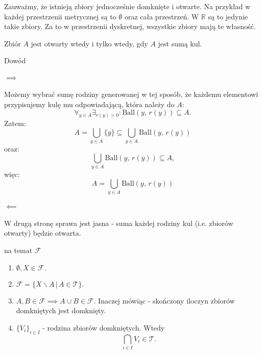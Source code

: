 \documentclass{article}
\numberwithin{defi}{section}
\numberwithin{defi}{section}
\newcommand{\R}{\mathbb{R}}
\newcommand{\Tau}{\mathcal{T}}
\newcommand{\Fau}{\mathcal{F}}
\newcommand{\ball}[2]{\text{Ball}(#1, \, #2)}
\begin{document}
Zauważmy, że istnieją zbiory jednocześnie domknięte i otwarte. Na przykład w każdej przestrzenii metrycznej są to $\emptyset$ oraz cała przestrzeń. W $\R$ są to jedynie takie zbiory. Za to w przestrzenii dyskretnej, wszystkie zbiory mają te własność.


\begin{twier}{}
    Zbiór $A$ jest otwarty wtedy i tylko wtedy, gdy $A$ jest sumą kul.
\end{twier}
\begin{dow}{Dowód}
    \paragraph{$\implies$} Możemy wybrać sumę rodziny generowanej w tej sposób, że każdemu elementowi przypisujemy kulę mu odpowiadającą, która należy do $A$: \begin{equation}
        \forall_{y \in A} \exists_{r(y) >0}: \ball{y}{r(y)} \subseteq A.
    \end{equation} Zatem: \begin{equation}
        A = \bigcup_{y \in A} \{ y \} \subseteq \bigcup_{y \in A} \ball{y}{r(y)}
    \end{equation} oraz: \begin{equation}
        \bigcup_{y \in A} \ball{y}{r(y)} \subseteq A,
    \end{equation} więc:\begin{equation}
        A = \bigcup_{y \in A} \ball{y}{r(y)}
    \end{equation}

    \paragraph{$\impliedby$} W drugą stronę sprawa jest jasna - suma każdej rodziny kul (i.e. zbiorów otwarty) będzie otwarta.
\end{dow}

\begin{obs}{na temat $\Fau$}
    \begin{enumerate}
        \item $\emptyset, X \in \Fau.$
        \item $\Fau = \{ X \backslash A \, \big| \, A \in \Tau \}.$
        \item $A, B \in \Fau \implies A \cup B \in \Fau.$ Inaczej mówiąc - skończony iloczyn zbiorów domkniętych jest domknięty.
        \item $\{V_i\}_{i \in I}$ - rodzina zbiorów domkniętych. Wtedy \begin{equation}
                  \bigcap_{i \in I} V_i \in \Tau.
              \end{equation}
    \end{enumerate}
\end{obs}
\end{document}
